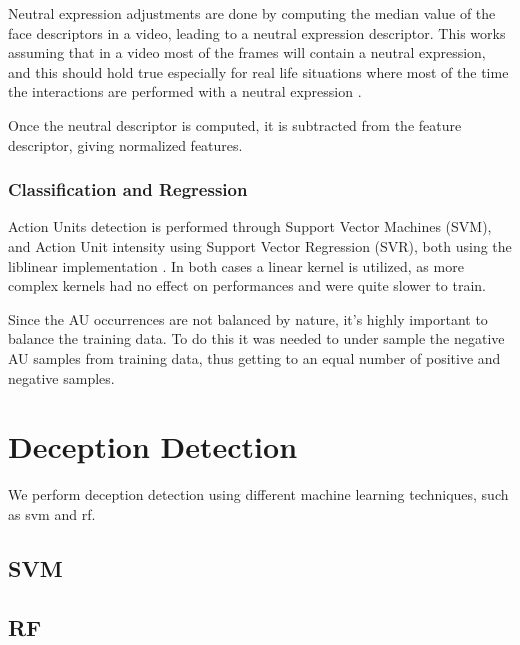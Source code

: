 Neutral expression adjustments are done by computing the median value of the face descriptors in a video, leading to a neutral expression descriptor. This works assuming that in a video most of the frames will contain a neutral expression, and this should hold true especially for real life situations where most of the time the interactions are performed with a neutral expression \cite{NatAffData}.

Once the neutral descriptor is computed, it is subtracted from the feature descriptor, giving normalized features. 

\subsubsection{Classification and Regression}
Action Units detection is performed through Support Vector Machines (SVM), and Action Unit intensity using Support Vector Regression (SVR), both using the liblinear implementation \cite{liblinear}. In both cases a linear kernel is utilized, as more complex kernels had no effect on performances and were quite slower to train.  

Since the AU occurrences are not balanced by nature, it's highly important to balance the training data. To do this it was needed to under sample the negative AU samples from training data, thus getting to an equal number of positive and negative samples.

\section{Deception Detection}
We perform deception detection using different machine learning techniques, such as svm and rf. 

\subsection{SVM}

\subsection{RF}

